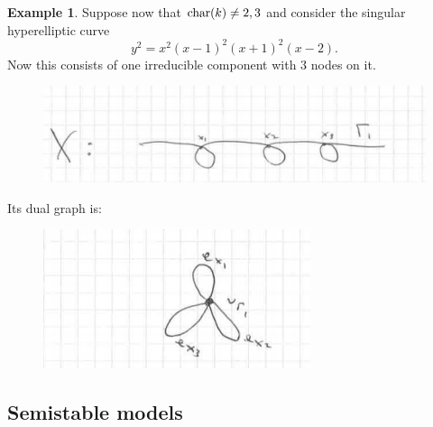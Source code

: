 \documentclass[12pt]{amsart}
\numberwithin{equation}{section}
\theoremstyle{remark}
\newtheorem{remark}[equation]{Remark}
\theoremstyle{definition}
\newtheorem{example}[equation]{Example}
\theoremstyle{definition}
\theoremstyle{definition}
\theoremstyle{definition}
\theoremstyle{definition}
\theoremstyle{definition}
\begin{document}
\begin{example} \label{dual graph ex 2}
Suppose now that $\textup{char}(k)\neq 2,3$ and consider the singular hyperelliptic curve
\[y^2=x^2(x-1)^2(x+1)^2(x-2).\]
Now this consists of one irreducible component with $3$ nodes on it.
\begin{figure} [!htb] 
\includegraphics[angle=0,scale=0.7]{curve_2}
\end{figure}

Its dual graph is:

\newpage

\begin{figure} [!htb] 
\includegraphics[angle=0,scale=0.8]{dual_graph_3}
\end{figure}
\end{example}


\subsection{Semistable models}
\end{document}
